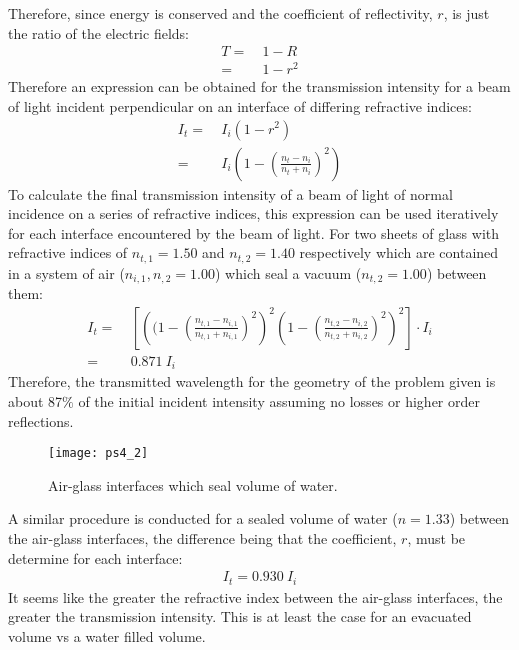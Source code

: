 \documentclass[8pt,a4paper,oneside]{article}
\begin{document}
Therefore, since energy is conserved and the coefficient of reflectivity, $r$, is just the ratio of the electric fields:
\begin{align}
	T =&~ 1 - R\\
	=&~1 - r^2
\end{align}
Therefore an expression can be obtained for the transmission intensity for a beam of light incident perpendicular on an interface of differing refractive indices:
\begin{align}
	I_t  =&~ I_i (1 - r^2)\\
	=&~I_i \left(1-\left(\frac{n_t - n_i}{n_t + n_i}\right)^2\right) 
\end{align}
To calculate the final transmission intensity of a beam of light of normal incidence on a series of refractive indices, this expression can be used iteratively for each interface encountered by the beam of light. For two sheets of glass with refractive indices of $n_{t,1} = 1.50$ and $n_{t,2} =  1.40$ respectively which are contained in a system of air ($n_{i,1}, n_{,2} = 1.00$) which seal a vacuum ($n_{t,2} = 1.00$) between them:
\begin{align}
	I_{t} =&~\left[\left((1 - \left(\frac{n_{t,1} - n_{i,1}}{n_{t,1} + n_{i,1}}\right)^2\right)^2 \left(1 - \left(\frac{n_{t,2} - n_{i,2}}{n_{t,2} + n_{i,2}}\right)^2\right)^2\right] \cdot I_i\\  
	=&~ 0.871~ I_{i}
\end{align}
Therefore, the transmitted wavelength for the geometry of the problem given is about 87$\%$ of the initial incident intensity assuming no losses or higher order reflections.
\begin{figure}[h!]
\begin{center}
\texttt{[image: ps4\_2]}
\caption{Air-glass interfaces which seal volume of water.}
\label{default}
\end{center}
\end{figure}

A similar procedure is conducted for a sealed volume of water ($n = 1.33$) between the air-glass interfaces, the difference being that the coefficient, $r$, must be determine for each interface:
\begin{align}
	I_{t} = 0.930~I_{i}
\end{align} 
It seems like the greater the refractive index between the air-glass interfaces, the greater the transmission intensity. This is at least the case for an evacuated volume vs a water filled volume.
\end{document}
